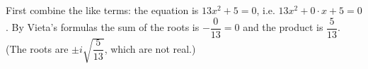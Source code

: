 First combine the like terms: the equation is $13x^2+5=0$, i.e. $13x^2+0\cdot x+5=0$. By Vieta's formulas the sum of the roots is $-\dfrac{0}{13}=\boxed{0}$ and the product is $\boxed{\dfrac{5}{13}}$. (The roots are $\pm i\sqrt{\dfrac{5}{13}}$, which are not real.)
